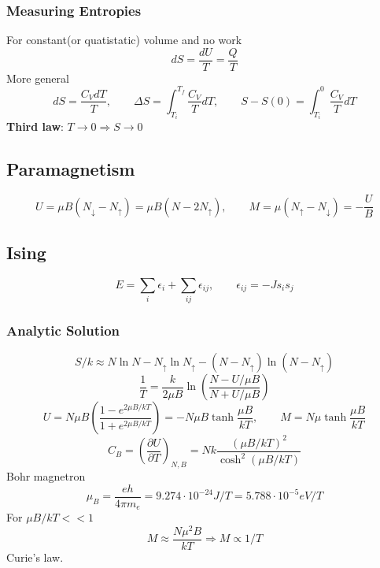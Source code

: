 \documentclass[a4paper,norsk, 10pt]{article}
\begin{document}
\subsubsection{Measuring Entropies}
For constant(or quatistatic) volume and no work
\begin{equation}
dS = \frac{dU}{T} = \frac{Q}{T}
\end{equation}
More general
\begin{equation}
dS = \frac{C_V dT}{T},\qquad \Delta S = \int_{T_i}^{T_f}\frac{C_V}{T}dT,\qquad S - S(0) = \int_{T_i}^{0}\frac{C_V}{T}dT
\end{equation}
\textbf{Third law}: $T\rightarrow 0 \Rightarrow S\rightarrow0$
\subsection{Paramagnetism}
\begin{equation}
U = \mu B(N_\downarrow - N_\uparrow) = \mu B (N- 2N_\uparrow),\qquad M = \mu(N_\uparrow - N_\downarrow) = -\frac{U}{B}
\end{equation}
\subsection{Ising}
\begin{equation}
E = \sum_i \epsilon_i + \sum_{ij}\epsilon_{ij}, \qquad  \epsilon_{ij} = -Js_is_j
\end{equation}
\subsubsection{Analytic Solution}
\begin{equation}
S/k \approx N\ln N - N_\uparrow \ln N_\uparrow - (N-N_\uparrow)\ln(N-N_\uparrow)
\end{equation}
\begin{equation}
\frac{1}{T} = \frac{k}{2\mu B}\ln\left(\frac{N- U/\mu B}{N+ U/\mu B}\right)
\end{equation}
\begin{equation}
U = N\mu B\left(\frac{1-e^{2\mu B/kT}}{1+e^{2\mu B/kT}}\right) = -N\mu B\tanh\frac{\mu B}{kT},\qquad M = N\mu \tanh\frac{\mu B}{kT}
\end{equation}
\begin{equation}
C_B = \left(\frac{\partial U}{\partial T}\right)_{N,B} = Nk \frac{(\mu B/kT)^2}{\cosh^2(\mu B/kT	)}
\end{equation}
Bohr magnetron
\begin{equation}
\mu_B = \frac{eh}{4\pi m_e} = 9.274\cdot10^{-24} J/T = 5.788\cdot10^{-5}eV/T
\end{equation}
For $\mu B/kT << 1$
\begin{equation}
M\approx \frac{N\mu^2B}{kT} \Rightarrow M \propto 1/T
\end{equation}
Curie's law.
\end{document}
